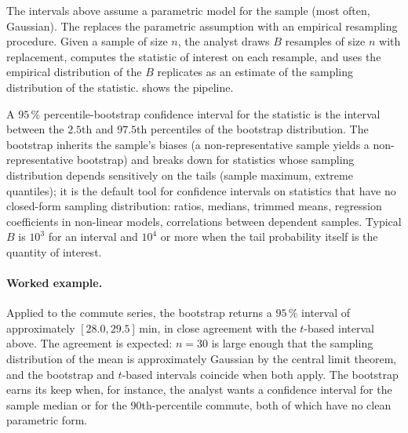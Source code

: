 The intervals above assume a parametric model for the sample (most
often, Gaussian). The 
\cite{paper:ch08-efron-tibshirani-1993} replaces the parametric
assumption with an empirical resampling procedure. Given a sample
of size $n$, the analyst draws $B$ resamples of size $n$ with
replacement, computes the statistic of interest on each resample,
and uses the empirical distribution of the $B$ replicates as an
estimate of the sampling distribution of the statistic.
 shows the pipeline.



A $95 \,\%$ percentile-bootstrap confidence interval for the
statistic is the interval between the $2.5$th and $97.5$th
percentiles of the bootstrap distribution. The bootstrap inherits
the sample's biases (a non-representative sample yields a
non-representative bootstrap) and breaks down for statistics whose
sampling distribution depends sensitively on the tails (sample
maximum, extreme quantiles); it is the default tool for confidence
intervals on statistics that have no closed-form sampling
distribution: ratios, medians, trimmed means, regression
coefficients in non-linear models, correlations between dependent
samples. Typical $B$ is $10^{3}$ for an interval and $10^{4}$ or
more when the tail probability itself is the quantity of interest.

\paragraph{Worked example.} Applied to the commute series, the
bootstrap returns a $95 \,\%$ interval of approximately
$[28.0, 29.5] \,\text{min}$, in close agreement with the $t$-based
interval above. The agreement is expected: $n = 30$ is large enough
that the sampling distribution of the mean is approximately
Gaussian by the central limit theorem, and the bootstrap and
$t$-based intervals coincide when both apply. The bootstrap earns
its keep when, for instance, the analyst wants a confidence
interval for the sample median or for the $90$th-percentile
commute, both of which have no clean parametric form.

